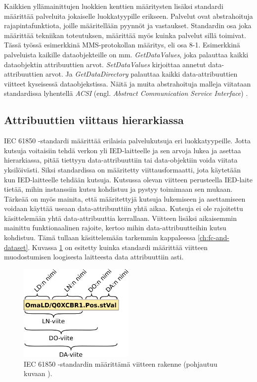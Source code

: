 Kaikkien yllämainittujen luokkien kenttien määritysten lisäksi standardi määrittää palveluita jokaiselle luokkatyypille erikseen. Palvelut ovat abstrahoituja rajapintafunktiota, joille määritellään pyynnöt ja vastaukset. Standardin osa joka määrittää tekniikan toteutuksen, määrittää myös kuinka palvelut sillä toimivat. Tässä työssä esimerkkinä MMS-protokollan määritys, eli osa 8-1. Esimerkkinä palveluista kaikille dataobjekteille on mm. \emph{GetDataValues}, joka palauttaa kaikki dataobjektin attribuuttien arvot. \emph{SetDataValues} kirjoittaa annetut data-att\-ri\-buut\-ti\-en arvot. Ja \emph{GetDataDirectory} palauttaa kaikki data-att\-ri\-buut\-ti\-en viitteet kyseisessä dataobjekstissa. Näitä ja muita abstrahoituja malleja viitataan standardissa lyhentellä \emph{ACSI} (engl. \emph{Abstract Communication Service Interface}) \mbox{\cite[s.~15,45--46]{IEC61850-7-2}} \mbox{\cite[s.~26]{IEC61850-7-1}}.


\subsection{Attribuuttien viittaus hierarkiassa}
IEC 61850 -standardi määrittää erilaisia palvelukutsuja eri luokkatyypeille. Jotta kutsuja voitaisiin tehdä verkon yli IED-laitteelle ja sen arvoja lukea ja asettaa hierarkiassa, pitää tiettyyn data-attribuuttiin tai data-objektiin voida viitata yksilöivästi. Siksi standardissa on määritetty viittausformaatti, jota käytetään kun IED-laitteelle tehdään kutsuja. Kutsussa olevan viitteen perusteella IED-laite tietää, mihin instanssiin kutsu kohdistuu ja pystyy toimimaan sen mukaan. Tärkeää on myös mainita, että määritettyjä kutsuja lukemiseen ja asettamiseen voidaan käyttää useaan data-attribuuttiin yhtä aikaa. Kutsuja ei ole rajoitettu käsittelemään yhtä data-attribuuttia kerrallaan. Viitteen lisäksi aikaisemmin mainittu funktionaalinen rajoite, kertoo mihin data-attribuutteihin kutsu kohdistuu. Tämä tullaan käsittelemään tarkemmin kappaleessa \ref{ch:fc-and-dataset}. Kuvassa \ref{fig:iec61850-data-reference} on esitetty kuinka standardi määrittää viitteen muodostumisen loogisesta laitteesta data attribuuttiin asti.

\begin{figure}[ht!]
	\includegraphics[width=0.5\textwidth]{pictures/iec61850-data-reference.png}
	\caption{IEC 61850 -standardin määrittämä viitteen rakenne (pohjautuu kuvaan \mbox{\cite[s.~93]{IEC61850-7-1}}).}
	\label{fig:iec61850-data-reference}
\end{figure}

